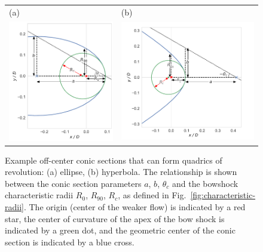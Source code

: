 \begin{figure}
\setlength\tabcolsep{2em}
\begin{tabular}{ll}
  (a) & (b) \\
  \includegraphics[height=0.45\linewidth]{figs/ellipse_edited}
      & \includegraphics[height=0.45\linewidth]{figs/hyperbola_edited}
\end{tabular}
\label{fig:conics}
\caption{Example off-center conic sections that can form quadrics of
  revolution: (a) ellipse, (b) hyperbola.  The relationship is shown
  between the conic section parameters \(a\), \(b\), \(\theta_c\) and the
  bowshock characteristic radii \(R_0\), \(R_{90}\), \(R_c\), as
  defined in Fig.~\ref{fig:characteristic-radii}. The origin (center
  of the weaker flow) is indicated by a red star, the center of
  curvature of the apex of the bow shock is indicated by a green dot,
  and the geometric center of the conic section is indicated by a blue
  cross.  }
\end{figure}
